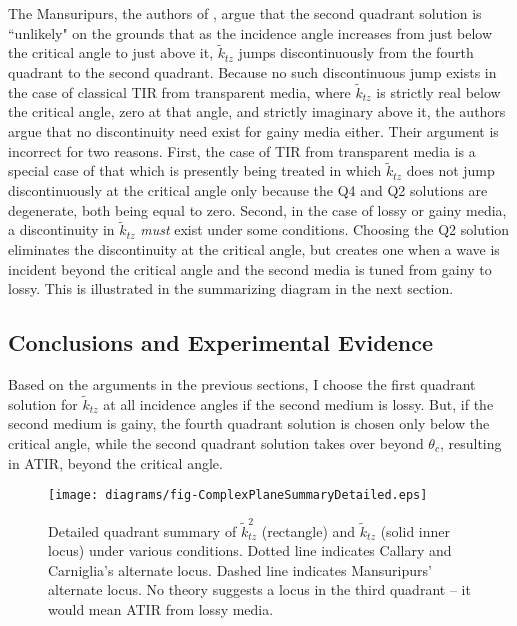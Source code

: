 \documentclass[12pt]{uthesis-v12}
\begin{document}
The Mansuripurs, the authors of \cite{Mansuripur}, argue that the second quadrant solution is ``unlikely" on the grounds that as the incidence angle increases from just below the critical angle to just above it, $\tilde{k}_{tz}$ jumps discontinuously from the fourth quadrant to the second quadrant. Because no such discontinuous jump exists in the case of classical TIR from transparent media, where $\tilde{k}_{tz}$ is strictly real below the critical angle, zero at that angle, and strictly imaginary above it, the authors argue that no discontinuity need exist for gainy media either. Their argument is incorrect for two reasons. First, the case of TIR from transparent media is a special case of that which is presently being treated in which $\tilde{k}_{tz}$ does not jump discontinuously at the critical angle only because the Q4 and Q2 solutions are degenerate, both being equal to zero. Second, in the case of lossy or gainy media, a discontinuity in $\tilde{k}_{tz}$ \textit{must} exist under some conditions. Choosing the Q2 solution eliminates the discontinuity at the critical angle, but creates one when a wave is incident beyond the critical angle and the second media is tuned from gainy to lossy. This is illustrated in the summarizing diagram in the next section.



\subsection{Conclusions and Experimental Evidence}
Based on the arguments in the previous sections, I choose the first quadrant solution for $\tilde{k}_{tz}$ at all incidence angles if the second medium is lossy. But, if the second medium is gainy, the fourth quadrant solution is chosen only below the critical angle, while the second quadrant solution takes over beyond $\theta_c$, resulting in ATIR, beyond the critical angle.

\begin{figure}[htb]
\centering
\texttt{[image: diagrams/fig-ComplexPlaneSummaryDetailed.eps]}
\caption[Detailed quadrant summary of $\tilde{k}^2_{tz}$ and $\tilde{k}_{tz}$ under various conditions]{Detailed quadrant summary of $\tilde{k}^2_{tz}$ (rectangle) and $\tilde{k}_{tz}$ (solid inner locus) under various conditions. Dotted line indicates Callary and Carniglia's alternate locus. Dashed line indicates Mansuripurs' alternate locus. No theory suggests a locus in the third quadrant -- it would mean ATIR from lossy media.
 \label{fig-ComplexPlaneSummaryDetailed}}
\end{figure}
\end{document}

